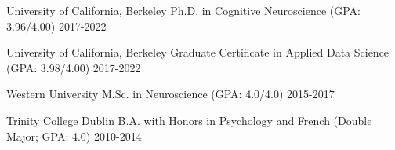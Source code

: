 
\begin{cvhonors}

 \cvhonor
    {University of California, Berkeley} %
    {Ph.D. in Cognitive Neuroscience (GPA: 3.96/4.00)}
    {} %
  	{2017-2022}
  	
 \cvhonor
    {University of California, Berkeley} %
    {Graduate Certificate in Applied Data Science (GPA: 3.98/4.00)}
    {} %
  	{2017-2022}
  	
 \cvhonor
    {Western University} %
    {M.Sc. in  Neuroscience (GPA: 4.0/4.0)}
    {} %
  	{2015-2017}
  	
 \cvhonor
    {Trinity College Dublin} %
    {B.A. with Honors in Psychology and French (Double Major; GPA: 4.0)}
    {} %
  	{2010-2014}
  	
\end{cvhonors}




